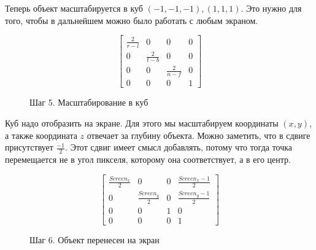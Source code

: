 \documentclass{article}
\begin{document}
Теперь объект масштабируется в куб $(-1, -1, -1), (1, 1, 1)$. Это нужно для того, чтобы в дальнейшем можно было работать с любым экраном.

$$
\begin{bmatrix}
\frac{2}{r - l} & 0 & 0 & 0 \\ 
0 & \frac{2}{t - b} & 0 & 0 \\
0 & 0 & \frac{2}{n - f} & 0 \\
0 & 0 & 0 & 1\end{bmatrix}
$$					  

\begin{center}
\begin{figure}[H]
\caption{Шаг 5. Масштабирование в куб}
\label{ris:image}
\end{figure}
\end{center}


Куб надо отобразить на экране. Для этого мы масштабируем координаты $(x, y)$, а также координата $z$ отвечает за глубину объекта. Можно заметить, что в сдвиге присутствует $\frac{-1}{2}$. Этот сдвиг имеет смысл добавлять, потому что тогда точка перемещается не в угол пикселя, которому она соответствует, а в его центр.

$$
\begin{bmatrix}\frac{Screen_x}{2} & 0 & 0 & \frac{Screen_x - 1}{2} \\ 
0 & \frac{Screen_y}{2} & 0 & \frac{Screen_y - 1}{2} \\
0 & 0 & 1 & 0 \\
0 & 0 & 0 & 1\end{bmatrix}
$$


\begin{center}
\begin{figure}[H]
\caption{Шаг 6. Объект перенесен на экран}
\label{ris:image}
\end{figure}
\end{center}
\end{document}

